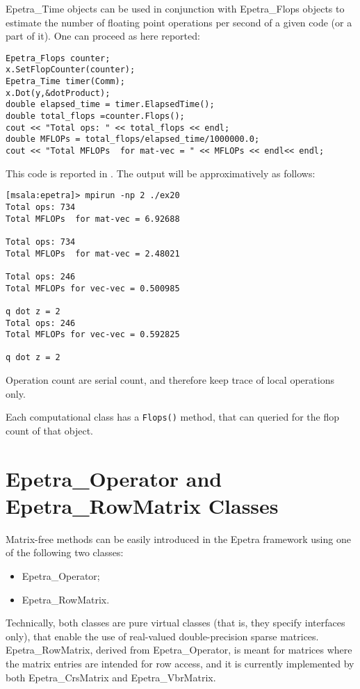 Epetra\_Time objects can be used in conjunction with Epetra\_Flops
objects to estimate the number of floating point operations per second
of a given code (or a part of it). One can proceed as here reported:
\begin{verbatim}
Epetra_Flops counter;
x.SetFlopCounter(counter);
Epetra_Time timer(Comm);
x.Dot(y,&dotProduct);
double elapsed_time = timer.ElapsedTime();
double total_flops =counter.Flops();
cout << "Total ops: " << total_flops << endl;
double MFLOPs = total_flops/elapsed_time/1000000.0;
cout << "Total MFLOPs  for mat-vec = " << MFLOPs << endl<< endl;
\end{verbatim}
This code is reported in . The output will be
approximatively as follows:
\begin{verbatim}
[msala:epetra]> mpirun -np 2 ./ex20
Total ops: 734
Total MFLOPs  for mat-vec = 6.92688

Total ops: 734
Total MFLOPs  for mat-vec = 2.48021

Total ops: 246
Total MFLOPs for vec-vec = 0.500985

q dot z = 2
Total ops: 246
Total MFLOPs for vec-vec = 0.592825

q dot z = 2
\end{verbatim}

\begin{remark} Operation count are serial count, and therefore keep
  trace of local operations only.
\end{remark}

\begin{remark}
  Each computational class has a \verb!Flops()! method, that can queried
  for the flop count of that object.
\end{remark}



\section{Epetra\_Operator and Epetra\_RowMatrix Classes}
\label{sec:operator}

Matrix-free methods can be easily introduced in the Epetra framework
using one of the following two classes:
\begin{itemize}
\item Epetra\_Operator;
\item Epetra\_RowMatrix.
\end{itemize}
Technically, both classes are pure virtual classes (that is, they
specify interfaces only), that enable the use of real-valued
double-precision sparse matrices. Epetra\_RowMatrix, derived from
Epetra\_Operator, is meant for matrices where the matrix entries are
intended for row access, and it is currently implemented by both
Epetra\_CrsMatrix and Epetra\_VbrMatrix.

